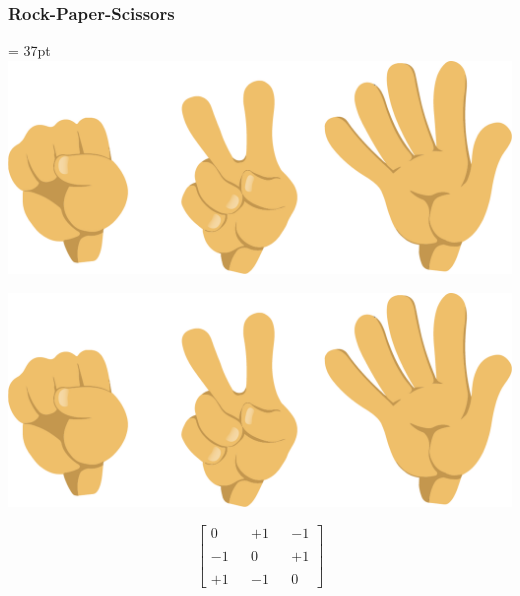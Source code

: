 \begin{frame}
    \frametitle{Rock-Paper-Scissors}

    \hfuzz = 37pt
    \hspace{3.9cm}
    \vspace{-1cm}
    \includegraphics[width=.27\textwidth]{Bin/rock-paper-scissors.png}
    \begin{multicols}{3}
        \begin{flushright}
            \includegraphics[height=0.12\textheight, angle=270]{Bin/rock-paper-scissors.png}
        \end{flushright}
            
        \columnbreak
 
        \begin{equation*}
            \begin{bmatrix}
                0 & & +1 & & -1 \\
                & & & & \\
                -1 & & 0 & & +1 \\
                & & & & \\
                +1 & & -1 & & 0
            \end{bmatrix}
        \end{equation*}

        \columnbreak
        \vfill
    \end{multicols}

\end{frame}



